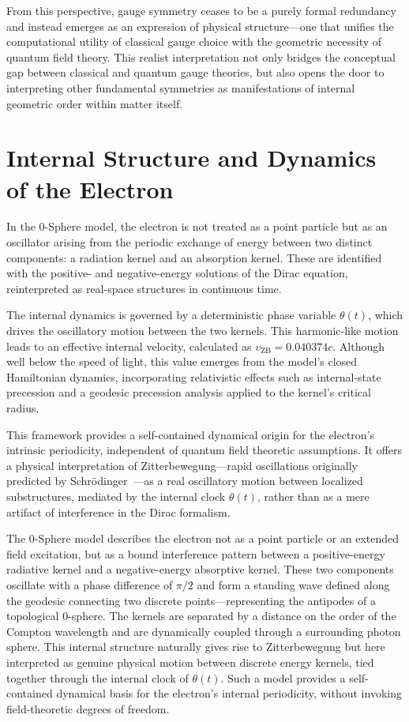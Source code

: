 \documentclass[%
 reprint,
 amsmath,amssymb,
 aps,
]{revtex4-1}
\numberwithin{equation}{section}%
\begin{document}
From this perspective, gauge symmetry ceases to be a purely formal redundancy and instead emerges as an expression of physical structure—one that unifies the computational utility of classical gauge choice with the geometric necessity of quantum field theory. This realist interpretation not only bridges the conceptual gap between classical and quantum gauge theories, but also opens the door to interpreting other fundamental symmetries as manifestations of internal geometric order within matter itself.


\section{Internal Structure and Dynamics of the Electron}

In the 0-Sphere model, the electron is not treated as a point particle but as an oscillator arising from the periodic exchange of energy between two distinct components: a radiation kernel and an absorption kernel. These are identified with the positive- and negative-energy solutions of the Dirac equation, reinterpreted as real-space structures in continuous time.

The internal dynamics is governed by a deterministic phase variable $\theta(t)$, which drives the oscillatory motion between the two kernels. This harmonic-like motion leads to an effective internal velocity, calculated as $v_{\mathrm{ZB}} = 0.040374c$. Although well below the speed of light, this value emerges from the model’s closed Hamiltonian dynamics, incorporating relativistic effects such as internal-state precession and a geodesic precession analysis applied to the kernel’s critical radius.

This framework provides a self-contained dynamical origin for the electron’s intrinsic periodicity, independent of quantum field theoretic assumptions. It offers a physical interpretation of Zitterbewegung---rapid oscillations originally predicted by Schrödinger~\cite{zitterbewegung_schrodinger1930}---as a real oscillatory motion between localized substructures, mediated by the internal clock $\theta(t)$, rather than as a mere artifact of interference in the Dirac formalism.

The 0-Sphere model describes the electron not as a point particle or an extended field excitation, but as a bound interference pattern between a positive-energy radiative kernel and a negative-energy absorptive kernel. These two components oscillate with a phase difference of $\pi / 2$ and form a standing wave defined along the geodesic connecting two discrete points—representing the antipodes of a topological 0-sphere. The kernels are separated by a distance on the order of the Compton wavelength and are dynamically coupled through a surrounding photon sphere. This internal structure naturally gives rise to Zitterbewegung but here interpreted as genuine physical motion between discrete energy kernels, tied together through the internal clock of $\theta (t)$. Such a model provides a self-contained dynamical basis for the electron's internal periodicity, without invoking field-theoretic degrees of freedom.
\end{document}
